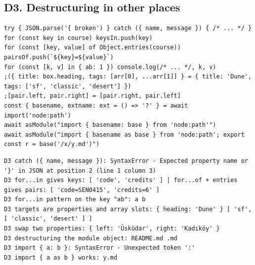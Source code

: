 \documentclass[
  10pt,
]{article}
\begin{document}
\hypertarget{d3-destructuring-in-other-places}{%
\subsection{D3. Destructuring in other
places}\label{d3-destructuring-in-other-places}}

\begin{verbatim}
try { JSON.parse('{ broken') } catch ({ name, message }) { /* ... */ }
for (const key in course) keysIn.push(key)
for (const [key, value] of Object.entries(course)) pairsOf.push(`${key}=${value}`)
for (const [k, v] in { ab: 1 }) console.log(/* ... */, k, v)
;({ title: box.heading, tags: [arr[0], ...arr[1]] } = { title: 'Dune', tags: ['sf', 'classic', 'desert'] })
;[pair.left, pair.right] = [pair.right, pair.left]
const { basename, extname: ext = () => '?' } = await import('node:path')
await asModule("import { basename: base } from 'node:path'")
await asModule("import { basename as base } from 'node:path'; export const r = base('/x/y.md')")
\end{verbatim}

\begin{verbatim}
D3 catch ({ name, message }): SyntaxError - Expected property name or '}' in JSON at position 2 (line 1 column 3)
D3 for...in gives keys: [ 'code', 'credits' ] | for...of + entries gives pairs: [ 'code=SEN0415', 'credits=6' ]
D3 for...in pattern on the key "ab": a b
D3 targets are properties and array slots: { heading: 'Dune' } [ 'sf', [ 'classic', 'desert' ] ]
D3 swap two properties: { left: 'Üsküdar', right: 'Kadıköy' }
D3 destructuring the module object: README.md .md
D3 import { a: b }: SyntaxError - Unexpected token ':'
D3 import { a as b } works: y.md
\end{verbatim}
\end{document}
